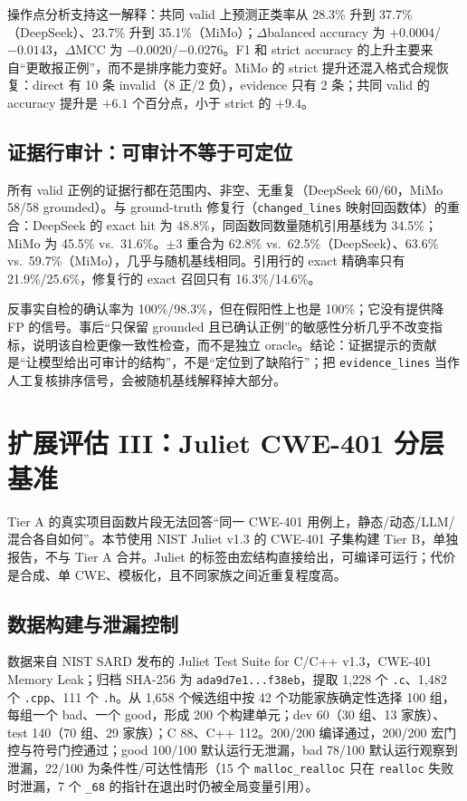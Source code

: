 \documentclass[conference]{IEEEtran}
\begin{document}
操作点分析支持这一解释：共同 valid 上预测正类率从 28.3\% 升到 37.7\%（DeepSeek）、23.7\% 升到 35.1\%（MiMo）；$\Delta$balanced accuracy 为 $+0.0004$/$-0.0143$，$\Delta$MCC 为 $-0.0020$/$-0.0276$。F1 和 strict accuracy 的上升主要来自“更敢报正例”，而不是排序能力变好。MiMo 的 strict 提升还混入格式合规恢复：direct 有 10 条 invalid（8 正/2 负），evidence 只有 2 条；共同 valid 的 accuracy 提升是 $+6.1$ 个百分点，小于 strict 的 $+9.4$。

\subsection{证据行审计：可审计不等于可定位}
所有 valid 正例的证据行都在范围内、非空、无重复（DeepSeek 60/60，MiMo 58/58 grounded）。与 ground-truth 修复行（\texttt{changed\_lines} 映射回函数体）的重合：DeepSeek 的 exact hit 为 48.8\%，同函数同数量随机引用基线为 34.5\%；MiMo 为 45.5\% vs.\ 31.6\%。$\pm3$ 重合为 62.8\% vs.\ 62.5\%（DeepSeek）、63.6\% vs.\ 59.7\%（MiMo），几乎与随机基线相同。引用行的 exact 精确率只有 21.9\%/25.6\%，修复行的 exact 召回只有 16.3\%/14.6\%。

反事实自检的确认率为 100\%/98.3\%，但在假阳性上也是 100\%；它没有提供降 FP 的信号。事后“只保留 grounded 且已确认正例”的敏感性分析几乎不改变指标，说明该自检更像一致性检查，而不是独立 oracle。结论：证据提示的贡献是“让模型给出可审计的结构”，不是“定位到了缺陷行”；把 \texttt{evidence\_lines} 当作人工复核排序信号，会被随机基线解释掉大部分。

\section{扩展评估 III：Juliet CWE-401 分层基准}
\label{sec:ext-juliet}

Tier A 的真实项目函数片段无法回答“同一 CWE-401 用例上，静态/动态/LLM/混合各自如何”。本节使用 NIST Juliet v1.3 的 CWE-401 子集构建 Tier B，单独报告，不与 Tier A 合并。Juliet 的标签由宏结构直接给出，可编译可运行；代价是合成、单 CWE、模板化，且不同家族之间近重复程度高。

\subsection{数据构建与泄漏控制}
数据来自 NIST SARD 发布的 Juliet Test Suite for C/C++ v1.3，CWE-401 Memory Leak；归档 SHA-256 为 \texttt{ada9d7e1...f38eb}，提取 1{,}228 个 \texttt{.c}、1{,}482 个 \texttt{.cpp}、111 个 \texttt{.h}。从 1{,}658 个候选组中按 42 个功能家族确定性选择 100 组，每组一个 bad、一个 good，形成 200 个构建单元；dev 60（30 组、13 家族）、test 140（70 组、29 家族）；C 88、C++ 112。200/200 编译通过，200/200 宏门控与符号门控通过；good 100/100 默认运行无泄漏，bad 78/100 默认运行观察到泄漏，22/100 为条件性/可达性情形（15 个 \texttt{malloc\_realloc} 只在 \texttt{realloc} 失败时泄漏，7 个 \texttt{\_68} 的指针在退出时仍被全局变量引用）。
\end{document}
